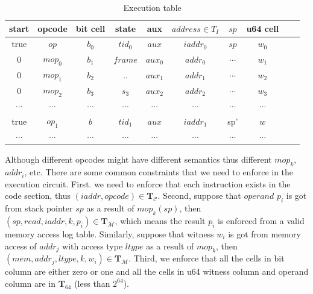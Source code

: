 \begin{table}[!h]
\begin{center}
\caption{Execution table}
\label{tbl:ex-table}
\begin{tabular}{ | c | c | c | c | c | c | c | c | c | c | }
  \hline
  start & opcode & bit cell & state & aux & $address \in T_{I}$ & $sp$ & u64 cell \\ 
  \hline
   true & $op$ & $b_0$ & $tid_0$ & $aux$ & $iaddr_0$ & $sp$ & $w_0$ \\ 
 \hline
   0 & $mop_0$ & $b_1$ & $frame$ & $aux_0$ & $addr_0$ & $\cdots$ & $w_1$ \\ 
 \hline
   0 & $mop_1$ & $b_2$ & $..$ & $aux_1$ & $addr_1$ & $\cdots$ & $w_2$ \\ 
 \hline 
  0 & $mop_2$ & $b_3$ & $s_3$ & $aux_2$ & $addr_2$ & $\cdots$ & $w_3$ \\ 
 \hline
   $\cdots$ & $\cdots$ & $\cdots$ & $\cdots$ & $\cdots$ & $\cdots$ & $\cdots$ & $\cdots$ \\ 
 \hline
   true & $op_1$ & $b$ & $tid_1$ & $aux$ & $iaddr_1$ & sp' & $w$ \\ 
 \hline
   $\cdots$ & $\cdots$ & $\cdots$ & $\cdots$ & $\cdots$ & $\cdots$ & $\cdots$ & $\cdots$ \\
 \hline
 \hline
\end{tabular}

\end{center}
\end{table}

\smallskip Although different opcodes might have different semantics thus different $mop_k$, $addr_i$, etc. There are some common constraints that we need to enforce in the execution circuit. First. we need to enforce that each instruction exists in the code section, thus $(iaddr, opcode) \in \mathbf{T}_\mathcal{C}$. Second, suppose that $operand$ $p_i$ is got from stack pointer $sp$ as a result of $mop_k(sp)$, then $(sp, read, iaddr, k, p_i) \in \mathbf{T}_{\mathcal{M}}$, which means the result $p_i$ is enforced from a valid memory access log table. Similarly, suppose that witness $w_i$ is got from memory access of $addr_j$ with access type $ltype$ as a result of $mop_k$, then $(mem, addr_j, ltype, k, w_i) \in \mathbf{T}_{\mathcal{M}}$.  Third, we enforce that all the cells in bit column are either zero or one and all the cells in u64 witness column and operand column are in $\mathbf{T}_{64}$ (less than $2^{64}$).


